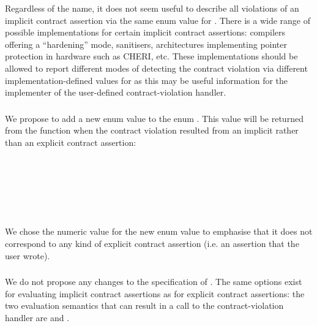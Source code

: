 Regardless of the name, it does not seem useful to describe all violations of an implicit contract assertion via the same enum value for . There is a wide range of possible implementations for certain implicit contract assertions: compilers offering a ``hardening'' mode, sanitisers, architectures implementing pointer protection in hardware such as CHERI, etc. These implementations should be allowed to report different modes of detecting the contract violation via different implementation-defined values for   as this may be useful information for the implementer of the user-defined contract-violation handler.

\subsubsection{}

We propose to add a new enum value  to the enum . This value will be returned from the  function when the contract violation resulted from an implicit rather than an explicit contract assertion:

\begin{small}
\phantom{\tcode{~~}} \\
\phantom{\tcode{~~~~}} \\
\phantom{\tcode{~~~~}} \\
\phantom{\tcode{~~~~}} \\
\phantom{\tcode{~~~~}} \\
\phantom{\tcode{~~}}\tcode{\};}
\end{small}

We chose the numeric value  for the new enum value to emphasise that it does not correspond to any kind of explicit contract assertion (i.e. an assertion that the user wrote).

\subsubsection{}


We do not propose any changes to the specification of . The same options exist for evaluating implicit contract assertions as for explicit contract assertions: the two evaluation semantics that can result in a call to the contract-violation handler are  and .

